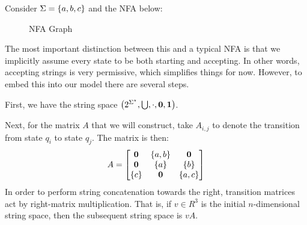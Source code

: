 \documentclass[12pt]{article}
\begin{document}
\begin{example}
  Consider \(\Sigma = \left\{a, b, c\right\}\) and the NFA below:

  \begin{figure}[h!]
  \centering
  \caption{NFA Graph}
  \end{figure}
  The most important distinction between this and a typical
  NFA is that we implicitly assume every state to be both starting
  and accepting.
  In other words, accepting strings is very permissive,
  which simplifies things for now.
  However,
  to embed this into our model there are several steps.

  First, we have the string space
  \(\left(2^{\Sigma^\star}, \bigcup, \cdot, \mathbf{0}, \mathbf{1}\right)\).

  Next, for the matrix \(A\) that we will construct,
  take \(A_{i, j}\) to denote the transition from state
  \(q_i\) to state \(q_j\).
  The matrix is then:
  \begin{align*}
    A =
      \begin{bmatrix}
        \mathbf{0} & \left\{a, b\right\} & \mathbf{0} \\
        \mathbf{0} & \left\{a\right\} & \left\{b\right\} \\
        \left\{c\right\} & \mathbf{0} & \left\{a, c\right\}
      \end{bmatrix}
  \end{align*}
  In order to perform string concatenation towards the right,
  transition matrices act by right-matrix multiplication.
  That is, if \(v \in R^3\) is the initial \(n\)-dimensional
  string space, then the subsequent string space is \(v A\).


\end{example}
\end{document}
